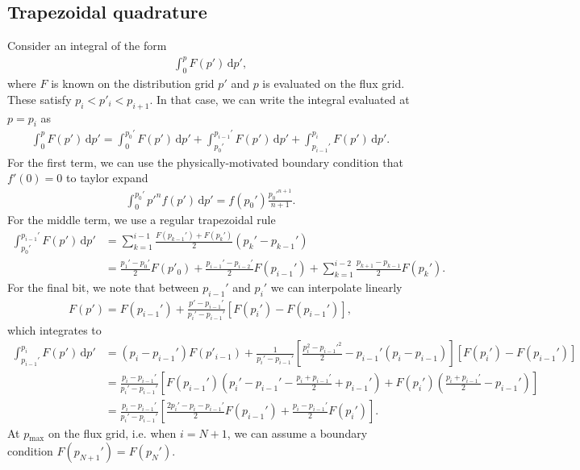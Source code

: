 \documentclass[11pt,a4paper]{article}
\newcommand{\rd}{\ensuremath{\mathrm{d}}}
\newcommand{\sub}[1]{\ensuremath{_{\text{#1}}}}
\begin{document}
\subsection{Trapezoidal quadrature}
Consider an integral of the form 
\begin{align*}
\int_0^p  F(p') \, \rd p', 
\end{align*}
where $F$ is known on the distribution grid $p'$ and $p$ is evaluated on the flux grid. These satisfy $p_i < p'_i < p_{i+1}$. In that case, we can write the integral evaluated at $p=p_i$ as
\begin{align}
\int_0^p F(p') \, \rd p' = \int_0^{p_0'} F(p') \,\rd p' + \int_{p_0'}^{p_{i-1}'} F(p') \,\rd p' + \int_{p_{i-1}'}^{p_i} F(p') \,\rd p'.
\end{align}
For the first term, we can use the physically-motivated boundary condition that $f'(0) = 0$ to taylor expand 
\begin{align}
\int_0^{p_0'} p'^n f(p') \, \rd p' = f(p_0') \frac{p_0'^{n+1}}{n+1}.
\end{align}
For the middle term, we use a regular trapezoidal rule
\begin{align}
\int_{p_0'}^{p_{i-1}'} F(p')\,\rd p' &= \sum_{k=1}^{i-1} \frac{F(p_{k-1}')+F(p_k')}{2}(p_k'-p_{k-1}') \nonumber \\
&= \frac{p_1'-p_0'}{2}F(p'_0) + \frac{p_{i-1}'-p_{i-2}'}{2}F(p_{i-1}') + \sum_{k=1}^{i-2}\frac{p_{k+1}-p_{k-1}}{2}F(p_k').
\end{align}
For the final bit, we note that between $p_{i-1}'$ and $p_i'$ we can interpolate linearly
\begin{align}
F(p') = F(p_{i-1}') + \frac{p' - p_{i-1}'}{p_i' - p_{i-1}'}[F(p_i') - F(p_{i-1}')],
\end{align}
which integrates to
\begin{align}
\int_{p_{i-1}'}^{p_i} F(p') \,\rd p' &= (p_i-p_{i-1}')F(p'_{i-1}) + \frac{1}{p_i'-p_{i-1}'}\left[\frac{p_i^2-p_{i-1}'^2}{2} - p_{i-1}'(p_i - p_{i-1})\right][F(p_i')-F(p_{i-1}')] \nonumber \\
&=\frac{p_i-p_{i-1}'}{p_i'-p_{i-1}'}\left[ F(p_{i-1}')\left(p_i' - p_{i-1}' - \frac{p_i+p_{i-1}'}{2}+p_{i-1}' \right) +F(p_i')  \left(\frac{p_i+p_{i-1}'}{2}-p_{i-1}'\right)\right] \nonumber \\
&=\frac{p_i-p_{i-1}'}{p_i'-p_{i-1}'}\left[ \frac{2p_i'-p_i-p_{i-1}'}{2} F(p_{i-1}')+ \frac{p_i-p_{i-1}'}{2}F(p_i')\right].
\end{align}
At $p\sub{max}$ on the flux grid, i.e. when $i=N+1$, we can assume a boundary condition $F(p_{N+1}') = F(p_N')$.
\end{document}
